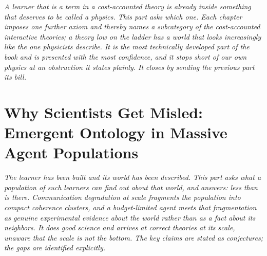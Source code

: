 \documentclass[12pt,openright,twoside]{book}
\theoremstyle{remark}
\theoremstyle{plain}
\theoremstyle{remark}
\theoremstyle{plain}
\theoremstyle{plain}
\begin{document}
\vspace{1em}
\begin{mdframed}[backgroundcolor=remarkgray, linecolor=gray!60,
                 linewidth=1pt, topline=false, rightline=false,
                 bottomline=false]
\small\itshape
A learner that is a term in a cost-accounted theory is already inside
something that deserves to be called a physics.
This part asks which one.
Each chapter imposes one further axiom and thereby names a subcategory of
the cost-accounted interactive theories; a theory low on the ladder has a
world that looks increasingly like the one physicists describe.
It is the most technically developed part of the book and is presented
with the most confidence, and it stops short of our own physics at an
obstruction it states plainly.
It closes by sending the previous part its bill.
\end{mdframed}

\bigskip


\part{Why Scientists Get Misled: Emergent Ontology in Massive Agent Populations}
\label{part:sciencebot}

\vspace{1em}
\begin{mdframed}[backgroundcolor=remarkgray, linecolor=gray!60,
                 linewidth=1pt, topline=false, rightline=false,
                 bottomline=false]
\small\itshape
The learner has been built and its world has been described.
This part asks what a \emph{population} of such learners can find out
about that world, and answers: less than is there.
Communication degradation at scale fragments the population into compact
coherence clusters, and a budget-limited agent meets that fragmentation
as genuine experimental evidence about the world rather than as a fact
about its neighbors.
It does good science and arrives at correct theories at its scale,
unaware that the scale is not the bottom.
The key claims are stated as conjectures; the gaps are identified
explicitly.
\end{mdframed}
\end{document}
